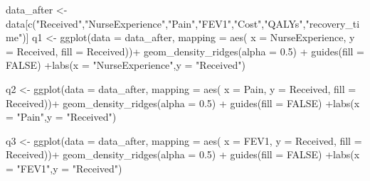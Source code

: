 \documentclass[
]{article}
\newenvironment{Shaded}{\begin{snugshade}}{\end{snugshade}}
\newcommand{\AttributeTok}[1]{\textcolor[rgb]{0.77,0.63,0.00}{#1}}
\newcommand{\ConstantTok}[1]{\textcolor[rgb]{0.00,0.00,0.00}{#1}}
\newcommand{\FloatTok}[1]{\textcolor[rgb]{0.00,0.00,0.81}{#1}}
\newcommand{\FunctionTok}[1]{\textcolor[rgb]{0.00,0.00,0.00}{#1}}
\newcommand{\NormalTok}[1]{#1}
\newcommand{\OtherTok}[1]{\textcolor[rgb]{0.56,0.35,0.01}{#1}}
\newcommand{\SpecialCharTok}[1]{\textcolor[rgb]{0.00,0.00,0.00}{#1}}
\newcommand{\StringTok}[1]{\textcolor[rgb]{0.31,0.60,0.02}{#1}}
\begin{document}
\begin{Shaded}
\begin{Highlighting}[]
\NormalTok{data\_after }\OtherTok{\textless{}{-}}\NormalTok{ data[}\FunctionTok{c}\NormalTok{(}\StringTok{"Received"}\NormalTok{,}\StringTok{"NurseExperience"}\NormalTok{,}\StringTok{"Pain"}\NormalTok{,}\StringTok{"FEV1"}\NormalTok{,}\StringTok{"Cost"}\NormalTok{,}\StringTok{"QALYs"}\NormalTok{,}\StringTok{"recovery\_time"}\NormalTok{)]}
\NormalTok{q1 }\OtherTok{\textless{}{-}} \FunctionTok{ggplot}\NormalTok{(}\AttributeTok{data =}\NormalTok{ data\_after, }\AttributeTok{mapping =} \FunctionTok{aes}\NormalTok{(}
   \AttributeTok{x =}\NormalTok{ NurseExperience, }
   \AttributeTok{y =}\NormalTok{ Received,}
   \AttributeTok{fill =}\NormalTok{ Received))}\SpecialCharTok{+} \FunctionTok{geom\_density\_ridges}\NormalTok{(}\AttributeTok{alpha =} \FloatTok{0.5}\NormalTok{) }\SpecialCharTok{+} \FunctionTok{guides}\NormalTok{(}\AttributeTok{fill =} \ConstantTok{FALSE}\NormalTok{) }\SpecialCharTok{+}\FunctionTok{labs}\NormalTok{(}\AttributeTok{x =} \StringTok{"NurseExperience"}\NormalTok{,}\AttributeTok{y =} \StringTok{"Received"}\NormalTok{)}

\NormalTok{q2 }\OtherTok{\textless{}{-}} \FunctionTok{ggplot}\NormalTok{(}\AttributeTok{data =}\NormalTok{ data\_after, }\AttributeTok{mapping =} \FunctionTok{aes}\NormalTok{(}
   \AttributeTok{x =}\NormalTok{ Pain, }
   \AttributeTok{y =}\NormalTok{ Received,}
   \AttributeTok{fill =}\NormalTok{ Received))}\SpecialCharTok{+} \FunctionTok{geom\_density\_ridges}\NormalTok{(}\AttributeTok{alpha =} \FloatTok{0.5}\NormalTok{) }\SpecialCharTok{+} \FunctionTok{guides}\NormalTok{(}\AttributeTok{fill =} \ConstantTok{FALSE}\NormalTok{) }\SpecialCharTok{+}\FunctionTok{labs}\NormalTok{(}\AttributeTok{x =} \StringTok{"Pain"}\NormalTok{,}\AttributeTok{y =} \StringTok{"Received"}\NormalTok{)}

\NormalTok{q3 }\OtherTok{\textless{}{-}} \FunctionTok{ggplot}\NormalTok{(}\AttributeTok{data =}\NormalTok{ data\_after, }\AttributeTok{mapping =} \FunctionTok{aes}\NormalTok{(}
   \AttributeTok{x =}\NormalTok{ FEV1, }
   \AttributeTok{y =}\NormalTok{ Received,}
   \AttributeTok{fill =}\NormalTok{ Received))}\SpecialCharTok{+} \FunctionTok{geom\_density\_ridges}\NormalTok{(}\AttributeTok{alpha =} \FloatTok{0.5}\NormalTok{) }\SpecialCharTok{+} \FunctionTok{guides}\NormalTok{(}\AttributeTok{fill =} \ConstantTok{FALSE}\NormalTok{) }\SpecialCharTok{+}\FunctionTok{labs}\NormalTok{(}\AttributeTok{x =} \StringTok{"FEV1"}\NormalTok{,}\AttributeTok{y =} \StringTok{"Received"}\NormalTok{)}


\end{Highlighting}
\end{Shaded}
\end{document}
